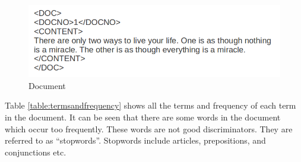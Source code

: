 \begin{figure}
\centering
\includegraphics[scale=0.5]{./figures/text.png}
\caption{Document} \label{fig:quote} 
\end{figure}

\begin{table}
\centering
{}
\caption{Terms and Frequency} \label{table:termsandfrequency}
\end{table}

Table \ref{table:termsandfrequency} shows all the terms and frequency of each term in the document. It can be seen that there are some words in the 
document which occur too frequently. These words are not good discriminators. They are referred to as ``stopwords''. Stopwords include
articles, prepositions, and conjunctions etc.

